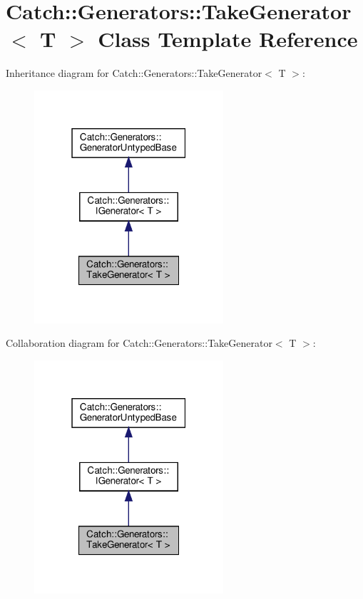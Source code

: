 \hypertarget{classCatch_1_1Generators_1_1TakeGenerator}{}\section{Catch\+:\+:Generators\+:\+:Take\+Generator$<$ T $>$ Class Template Reference}
\label{classCatch_1_1Generators_1_1TakeGenerator}


Inheritance diagram for Catch\+:\+:Generators\+:\+:Take\+Generator$<$ T $>$\+:
\nopagebreak
\begin{figure}[H]
\begin{center}
\leavevmode
\includegraphics[width=199pt]{classCatch_1_1Generators_1_1TakeGenerator__inherit__graph}
\end{center}
\end{figure}


Collaboration diagram for Catch\+:\+:Generators\+:\+:Take\+Generator$<$ T $>$\+:
\nopagebreak
\begin{figure}[H]
\begin{center}
\leavevmode
\includegraphics[width=199pt]{classCatch_1_1Generators_1_1TakeGenerator__coll__graph}
\end{center}
\end{figure}
